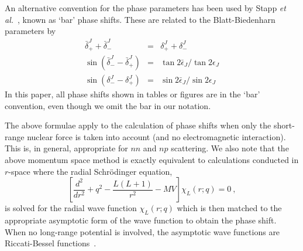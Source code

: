 An alternative convention for the phase parameters has been used by Stapp {\it 
et al.}~\cite{SYM57}, known as `bar' phase shifts. These are related to 
the Blatt-Biedenharn parameters by
\begin{eqnarray}
\bar{\delta}^J_+ + \bar{\delta}^J_- & = & \delta^J_+ + \delta^J_- 
\nonumber \\
\sin (\bar{\delta}^J_- - \bar{\delta}^J_+) & = & 
{\tan 2\bar{\epsilon}_J}/{\tan 2\epsilon_J}
\label{23.5} \\
\sin (\delta^J_- - \delta^J_+) & = & 
{\sin 2\bar{\epsilon}_J}/{\sin 2\epsilon_J}
\nonumber
\end{eqnarray}
In this paper, all phase shifts shown in tables or figures are in
the `bar' convention, even though we omit the bar in
our notation.

The above formulae apply to the calculation of phase shifts when only
the short-range nuclear force is taken into account (and no electromagnetic
interaction). This is, in general, appropriate for $nn$ and $np$
scattering. We also note that the above momentum space method is
exactly equivalent to calculations conducted in $r$-space
where the radial Schr\"odinger equation,
\begin{equation}
   \left[\frac{d^2}{dr^2}+q^2-\frac{L(L+1)}{r^2}-MV\right]
        \chi_L(r;q) = 0 \: , 
\label{eq_SCH}
\end{equation}
is solved for the radial wave function $\chi_L(r;q)$
which is then matched to the appropriate asymptotic form
of the wave function to obtain the phase shift.
When no long-range potential is involved, the asymptotic wave
functions are Riccati-Bessel functions~\cite{AS70}.


